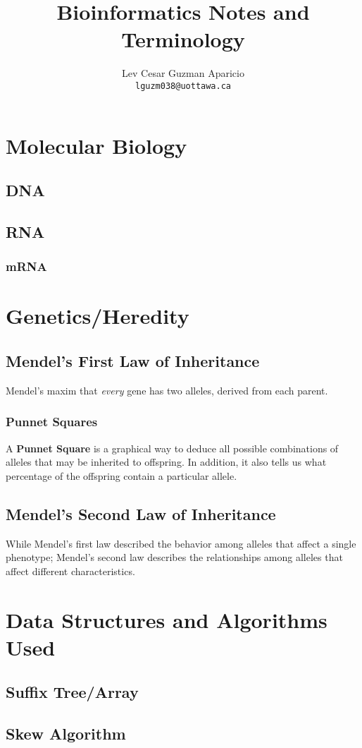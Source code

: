\documentclass[12pt, lettersize]{article}
\title{Bioinformatics Notes and Terminology}
\author{Lev Cesar Guzman Aparicio \\ \texttt{lguzm038@uottawa.ca}}
\begin{document}
\maketitle

\section{Molecular Biology}

\subsection{DNA}

\subsection{RNA}

\subsubsection{mRNA}

\section{Genetics/Heredity}

\subsection{Mendel's First Law of Inheritance}

Mendel's maxim that \textsl{every} gene has two alleles, derived from each parent. 

\subsubsection{Punnet Squares}

A \textbf{Punnet Square} is a graphical way to deduce all possible combinations of alleles that may be inherited to offspring. In addition, it also tells us what percentage of the offspring contain a particular allele.



\subsection{Mendel's Second Law of Inheritance}

While Mendel's first law described the behavior among alleles that affect a single phenotype; Mendel's second law describes the relationships among alleles that affect different characteristics.  

\section{Data Structures and Algorithms Used}

\subsection{Suffix Tree/Array}

\subsection{Skew Algorithm}
\end{document}

